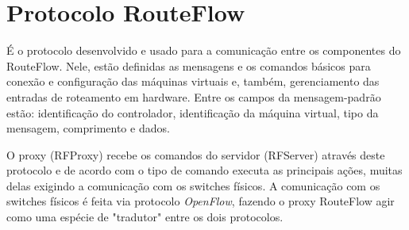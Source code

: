 \section{Protocolo RouteFlow}

É o protocolo desenvolvido e usado para a comunicação entre
os componentes do RouteFlow. Nele, estão definidas as
mensagens e os comandos básicos para conexão e configuração
das máquinas virtuais e, também, gerenciamento das entradas
de roteamento em hardware. Entre os campos da
mensagem-padrão estão: identificação do controlador,
identificação da máquina virtual, tipo da mensagem,
comprimento e dados. 

O proxy (RFProxy) recebe os comandos do
servidor (RFServer) através deste protocolo e de acordo com o
tipo de comando executa as principais ações, muitas delas
exigindo a comunicação com os switches físicos. A
comunicação com os switches físicos é feita via protocolo
\textit{OpenFlow}, fazendo o proxy RouteFlow agir como
uma espécie de "tradutor" entre os dois protocolos.

